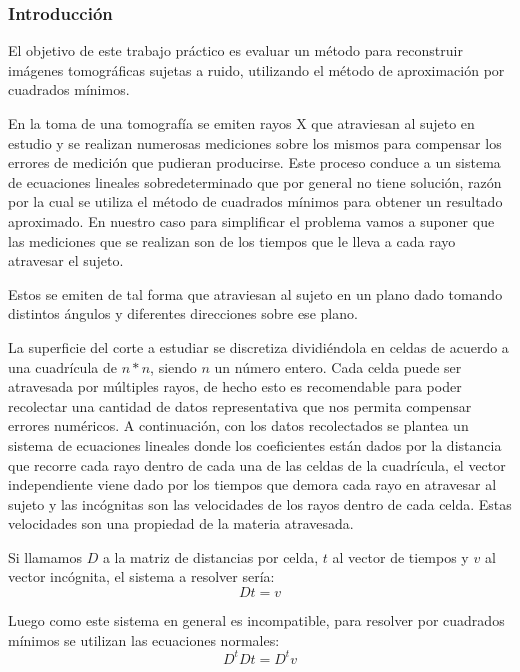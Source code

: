 \subsubsection*{Introducción}
\par El objetivo de este trabajo práctico es evaluar un método para reconstruir imágenes tomográficas sujetas a ruido, utilizando el método de aproximación por cuadrados mínimos.

\par En la toma de una tomografía se emiten rayos X que atraviesan al sujeto en estudio y se realizan numerosas mediciones sobre los mismos para compensar los errores de medición que pudieran producirse. Este proceso conduce a un sistema de ecuaciones lineales sobredeterminado que por general no tiene solución, razón por la cual se utiliza el método de cuadrados mínimos para obtener un resultado aproximado.
En nuestro caso para simplificar el problema vamos a suponer que las mediciones que se realizan son de los tiempos que le lleva a cada rayo atravesar el sujeto.

\par Estos se emiten de tal forma que atraviesan al sujeto en un plano dado tomando distintos ángulos y diferentes direcciones sobre ese plano.

\par La superficie del corte a estudiar se discretiza dividiéndola en celdas de acuerdo a una cuadrícula de $n*n$, siendo $n$ un número entero. Cada celda puede ser atravesada por múltiples rayos, de hecho esto es recomendable para poder recolectar una cantidad de datos representativa que nos permita compensar errores numéricos.
A continuación, con los datos recolectados se plantea un sistema de ecuaciones lineales donde los coeficientes están dados por la distancia que recorre cada rayo dentro de cada una de las celdas de la cuadrícula, el vector independiente viene dado por los tiempos que demora cada rayo en atravesar al sujeto y las incógnitas son las velocidades de los rayos dentro de cada celda. Estas velocidades son una propiedad de la materia atravesada.

\par Si llamamos $D$ a la matriz de distancias por celda, $t$ al vector de tiempos y $v$ al vector incógnita, el sistema a resolver sería:
\begin{displaymath}
D t = v
\end{displaymath}

\par Luego como este sistema en general es incompatible, para resolver por cuadrados mínimos se utilizan las ecuaciones normales:
\begin{displaymath}
D^{t}D t = D^{t} v
\end{displaymath}


